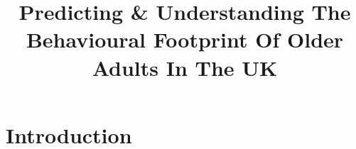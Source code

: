 \documentclass{article}
\title{Predicting \& Understanding The Behavioural Footprint Of Older
Adults In The UK}
\author{
  }
\begin{document}
\maketitle

\def\tightlist{}


\begin{abstract}

\end{abstract}


\hypertarget{introduction}{%
\section{Introduction}\label{introduction}}



\end{document}

